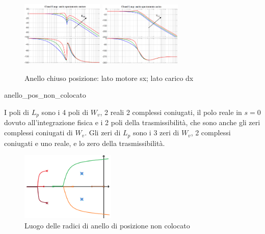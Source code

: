 \begin{figure}[h]
    \centering
    \includegraphics[width=0.35\textwidth]{Immagini/anello_chiuso_posizione_lato_motore.png}
    \includegraphics[width=0.35\textwidth]{Immagini/anello_chiuso_posizione_lato_carico.png}
    \caption{Anello chiuso posizione: lato motore sx; lato carico dx}
\end{figure}



{anello_pos_non_colocato}

I poli di \(L_p\) sono i 4 poli di \(W_v\), 2 reali 2 complessi coniugati, il polo reale in \(s=0\) dovuto all'integrazione fisica e i 2 poli della trasmissibilità, che sono anche gli zeri complessi coniugati di \(W_v\).
Gli zeri di \(L_p\) sono i 3 zeri di \(W_v\), 2 complessi coniugati e uno reale, e lo zero della trasmissibilità.

\begin{figure}[h]
    \centering
    \includegraphics[width=0.4\textwidth]{Immagini/rlocus_non_colocato_posizione.png}
    \caption{Luogo delle radici di anello di posizione non colocato}
\end{figure}


